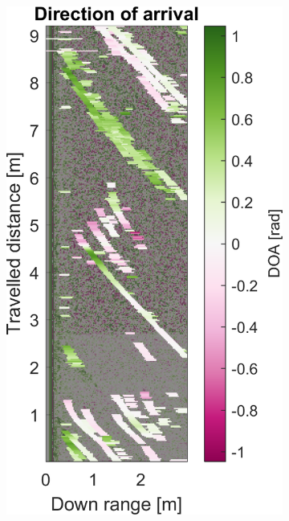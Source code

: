 \begin{figure}[htbp]
\begin{subfigure}[t]{0.475\linewidth}
        \includegraphics[width=\linewidth,max height=.475\textheight]{gfx/results/mancave_doa.png}
    \end{subfigure}%
    \hfill%
    \begin{subfigure}[t]{0.475\linewidth}   
        \centering 

\end{subfigure}
\end{figure}
